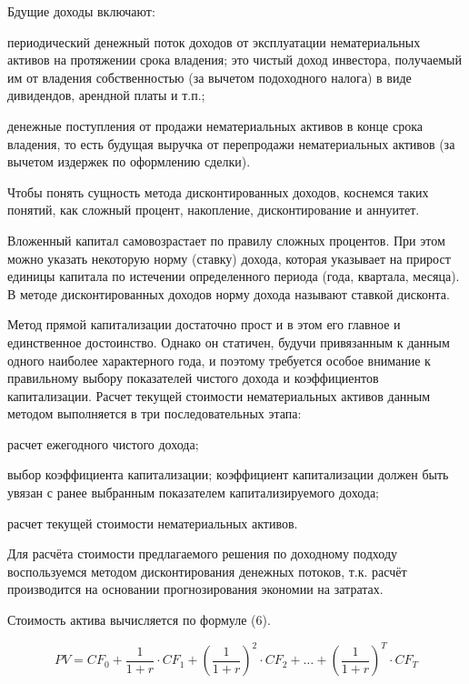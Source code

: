 Бдущие доходы включают:
\begin{list}{}{\leftmargin=1.5cm}
	\item периодический денежный поток доходов от эксплуатации нематериальных активов на протяжении срока владения; это чистый доход инвестора, получаемый им от владения собственностью (за вычетом подоходного налога) в виде дивидендов, арендной платы и т.п.; 
	\item денежные поступления от продажи нематериальных активов в конце срока владения, то есть будущая выручка от перепродажи нематериальных активов (за вычетом издержек по оформлению сделки). 
\end{list}

Чтобы понять сущность метода дисконтированных доходов, коснемся таких понятий, как сложный процент, накопление, дисконтирование и аннуитет. 

Вложенный капитал самовозрастает по правилу сложных процентов. При этом можно указать некоторую норму (ставку) дохода, которая указывает на прирост единицы капитала по истечении определенного периода (года, квартала, месяца). В методе дисконтированных доходов норму дохода называют ставкой дисконта. 

Метод прямой капитализации достаточно прост и в этом его главное и единственное достоинство. Однако он статичен, будучи привязанным к данным одного наиболее характерного года, и поэтому требуется особое внимание к правильному выбору показателей чистого дохода и коэффициентов капитализации. Расчет текущей стоимости нематериальных активов данным методом выполняется в три последовательных этапа:
\begin{list}{}{\leftmargin=1.5cm}
	\item расчет ежегодного чистого дохода;
	\item выбор коэффициента капитализации; коэффициент капитализации должен быть увязан с ранее выбранным показателем капитализируемого дохода;
	\item расчет текущей стоимости нематериальных активов. 
\end{list}

Для расчёта стоимости предлагаемого решения по доходному подходу воспользуемся методом дисконтирования денежных потоков, т.к. расчёт производится на основании прогнозирования экономии на затратах.

Стоимость актива вычисляется по формуле (6).

\begin{equation}
	PV = CF_0 + \frac{1}{1 + r} \cdot CF_1 + \left( \frac{1}{1 + r} \right)^2 \cdot CF_2 + \ldots + \left( \frac{1}{1 + r} \right)^T \cdot CF_T
\end{equation}

